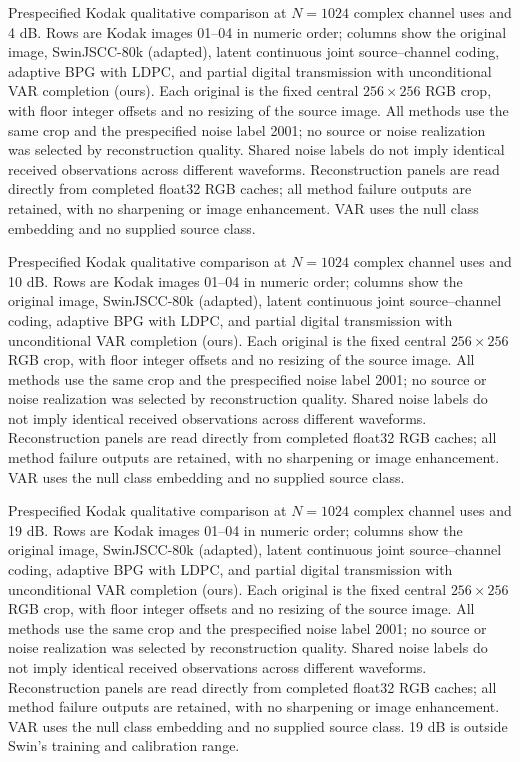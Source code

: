 
\caption{Prespecified Kodak qualitative comparison at $N=1024$ complex channel uses and 4 dB. Rows are Kodak images 01--04 in numeric order; columns show the original image, SwinJSCC-80k (adapted), latent continuous joint source--channel coding, adaptive BPG with LDPC, and partial digital transmission with unconditional VAR completion (ours). Each original is the fixed central $256\times256$ RGB crop, with floor integer offsets and no resizing of the source image. All methods use the same crop and the prespecified noise label 2001; no source or noise realization was selected by reconstruction quality. Shared noise labels do not imply identical received observations across different waveforms. Reconstruction panels are read directly from completed float32 RGB caches; all method failure outputs are retained, with no sharpening or image enhancement. VAR uses the null class embedding and no supplied source class.}
\label{fig:kodak-04db-fixed}

\caption{Prespecified Kodak qualitative comparison at $N=1024$ complex channel uses and 10 dB. Rows are Kodak images 01--04 in numeric order; columns show the original image, SwinJSCC-80k (adapted), latent continuous joint source--channel coding, adaptive BPG with LDPC, and partial digital transmission with unconditional VAR completion (ours). Each original is the fixed central $256\times256$ RGB crop, with floor integer offsets and no resizing of the source image. All methods use the same crop and the prespecified noise label 2001; no source or noise realization was selected by reconstruction quality. Shared noise labels do not imply identical received observations across different waveforms. Reconstruction panels are read directly from completed float32 RGB caches; all method failure outputs are retained, with no sharpening or image enhancement. VAR uses the null class embedding and no supplied source class.}
\label{fig:kodak-10db-fixed}

\caption{Prespecified Kodak qualitative comparison at $N=1024$ complex channel uses and 19 dB. Rows are Kodak images 01--04 in numeric order; columns show the original image, SwinJSCC-80k (adapted), latent continuous joint source--channel coding, adaptive BPG with LDPC, and partial digital transmission with unconditional VAR completion (ours). Each original is the fixed central $256\times256$ RGB crop, with floor integer offsets and no resizing of the source image. All methods use the same crop and the prespecified noise label 2001; no source or noise realization was selected by reconstruction quality. Shared noise labels do not imply identical received observations across different waveforms. Reconstruction panels are read directly from completed float32 RGB caches; all method failure outputs are retained, with no sharpening or image enhancement. VAR uses the null class embedding and no supplied source class. 19 dB is outside Swin's training and calibration range.}
\label{fig:kodak-19db-fixed}
